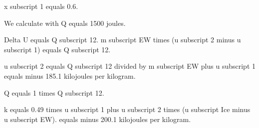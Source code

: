 x subscript 1 equals 0.6.  

We calculate with Q equals 1500 joules.  

Delta U equals Q subscript 12.  
m subscript EW times (u subscript 2 minus u subscript 1) equals Q subscript 12.  

u subscript 2 equals Q subscript 12 divided by m subscript EW plus u subscript 1 equals minus 185.1 kilojoules per kilogram.  

Q equals 1 times Q subscript 12.  

k equals 0.49 times u subscript 1 plus u subscript 2 times (u subscript Ice minus u subscript EW).  
equals minus 200.1 kilojoules per kilogram.